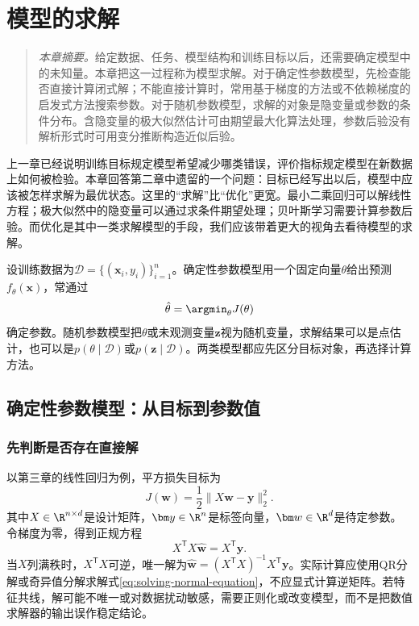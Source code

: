 \chapter{模型的求解}
\label{chap:model-solving}

\begin{quote}\small
\textit{本章摘要。}给定数据、任务、模型结构和训练目标以后，还需要确定模型中的未知量。本章把这一过程称为模型求解。对于确定性参数模型，先检查能否直接计算闭式解；不能直接计算时，常用基于梯度的方法或不依赖梯度的启发式方法搜索参数。对于随机参数模型，求解的对象是隐变量或参数的条件分布。含隐变量的极大似然估计可由期望最大化算法处理，参数后验没有解析形式时可用变分推断构造近似后验。
\end{quote}

上一章已经说明训练目标规定模型希望减少哪类错误，评价指标规定模型在新数据上如何被检验。本章回答第二章中遗留的一个问题：目标已经写出以后，模型中应该被怎样求解为最优状态。这里的“求解”比“优化”更宽。最小二乘回归可以解线性方程；极大似然中的隐变量可以通过求条件期望处理；贝叶斯学习需要计算参数后验。而优化是其中一类求解模型的手段，我们应该带着更大的视角去看待模型的求解。

设训练数据为$\mathcal D=\{(\bm x_i,y_i)\}_{i=1}^n$。确定性参数模型用一个固定向量$\theta$给出预测$f_\theta(\bm x)$，常通过
\begin{equation}
 \hat\theta=\argmin_\theta J(\theta)
 \label{eq:solving-deterministic-objective}
\end{equation}
确定参数。随机参数模型把$\theta$或未观测变量$\bm z$视为随机变量，求解结果可以是点估计，也可以是$p(\theta\mid\mathcal D)$或$p(\bm z\mid\mathcal D)$。两类模型都应先区分目标对象，再选择计算方法。

\section{确定性参数模型：从目标到参数值}

\subsection{先判断是否存在直接解}
以第三章的线性回归为例，平方损失目标为
\begin{equation}
 J(\bm w)=\frac12\|X\bm w-\bm y\|_2^2.
 \label{eq:solving-least-squares}
\end{equation}
其中$X\in\R^{n\times d}$是设计矩阵，$\bm y\in\R^n$是标签向量，$\bm w\in\R^d$是待定参数。令梯度为零，得到正规方程
\begin{equation}
 X^{\mathsf T}X\hat{\bm w}=X^{\mathsf T}\bm y.
 \label{eq:solving-normal-equation}
\end{equation}
当$X$列满秩时，$X^{\mathsf T}X$可逆，唯一解为$\hat{\bm w}=(X^{\mathsf T}X)^{-1}X^{\mathsf T}\bm y$。实际计算应使用QR分解或奇异值分解求解式\eqref{eq:solving-normal-equation}，不应显式计算逆矩阵。若特征共线，解可能不唯一或对数据扰动敏感，需要正则化或改变模型，而不是把数值求解器的输出误作稳定结论。

